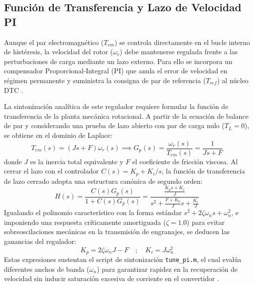 \documentclass[conference]{IEEEtran}
\begin{document}
\subsection{Función de Transferencia y Lazo de Velocidad PI}
Aunque el par electromagnético ($T_{em}$) se controla directamente en el bucle interno de histéresis, la velocidad del rotor ($\omega_r$) debe mantenerse regulada frente a las perturbaciones de carga mediante un lazo externo. Para ello se incorpora un compensador Proporcional-Integral (PI) que anula el error de velocidad en régimen permanente y suministra la consigna de par de referencia ($T_{ref}$) al núcleo DTC \cite{ong1998}.

La sintonización analítica de este regulador requiere formular la función de transferencia de la planta mecánica rotacional. A partir de la ecuación de balance de par y considerando una prueba de lazo abierto con par de carga nulo ($T_L = 0$), se obtiene en el dominio de Laplace:
\begin{equation}
    T_{em}(s) = (J s + F) \omega_r(s) \implies G_p(s) = \frac{\omega_r(s)}{T_{em}(s)} = \frac{1}{J s + F}
    \label{eq:tf_planta}
\end{equation}
donde $J$ es la inercia total equivalente y $F$ el coeficiente de fricción viscosa. Al cerrar el lazo con el controlador $C(s) = K_p + K_i/s$, la función de transferencia de lazo cerrado adopta una estructura canónica de segundo orden:
\begin{equation}
    H(s) = \frac{C(s) G_p(s)}{1 + C(s) G_p(s)} = \frac{\frac{K_p s + K_i}{J}}{s^2 + \frac{F + K_p}{J} s + \frac{K_i}{J}}
    \label{eq:tf_lazocerrado}
\end{equation}
Igualando el polinomio característico con la forma estándar $s^2 + 2\zeta\omega_n s + \omega_n^2$, e imponiendo una respuesta críticamente amortiguada ($\zeta = 1.0$) para evitar sobreoscilaciones mecánicas en la transmisión de engranajes, se deducen las ganancias del regulador:
\begin{equation}
    K_p = 2\zeta\omega_n J - F \quad ; \quad K_i = J \omega_n^2
    \label{eq:kp_ki}
\end{equation}
Estas expresiones sustentan el script de sintonización \texttt{tune\_pi.m}, el cual evalúa diferentes anchos de banda ($\omega_n$) para garantizar rapidez en la recuperación de velocidad sin inducir saturación excesiva de corriente en el convertidor \cite{krishnan2001}.
\end{document}
